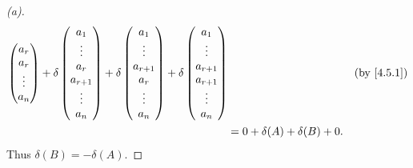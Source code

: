 \begin{proof}[(a)]
\begin{align*}
\begin{pmatrix}
                  a_r    \\
                  a_r    \\
                  \vdots \\
                  a_n
                \end{pmatrix} + \delta\begin{pmatrix}
                                        a_1       \\
                                        \vdots    \\
                                        a_r       \\
                                        a_{r + 1} \\
                                        \vdots    \\
                                        a_n
                                      \end{pmatrix} + \delta\begin{pmatrix}
                                                              a_1       \\
                                                              \vdots    \\
                                                              a_{r + 1} \\
                                                              a_r       \\
                                                              \vdots    \\
                                                              a_n
                                                            \end{pmatrix} + \delta\begin{pmatrix}
                                                                                    a_1       \\
                                                                                    \vdots    \\
                                                                                    a_{r + 1} \\
                                                                                    a_{r + 1} \\
                                                                                    \vdots    \\
                                                                                    a_n
                                                                                  \end{pmatrix} &  & \by{4.5.1} \\
      & = 0 + \delta(A) + \delta(B) + 0.
  \end{align*}
  Thus \(\delta(B) = -\delta(A)\).


\end{proof}
